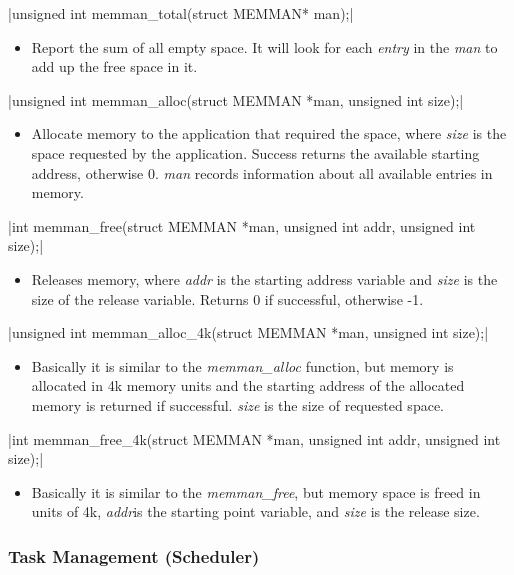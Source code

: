 \documentclass{swfcthesis}
\begin{document}
\csingle|unsigned int memman_total(struct MEMMAN* man);|
\begin{itemize}
\item Report the sum of all empty space. It will look for each \emph{entry} in the
  \emph{man} to add up the free space in it.
  
\end{itemize}

\csingle|unsigned int memman_alloc(struct MEMMAN *man, unsigned int size);|
\begin{itemize}
\item Allocate memory to the application that required the space, where \emph{size} is the space requested by the
  application. Success returns the available starting address, otherwise 0. \emph{man} records
  information about all available entries in memory.
  
\end{itemize}

\csingle|int memman_free(struct MEMMAN *man, unsigned int addr, unsigned int size);|
\begin{itemize}
\item Releases memory, where \emph{addr} is the starting address variable and
  \emph{size} is the size of the release variable. Returns 0 if successful, otherwise
  -1.
\end{itemize}

\csingle|unsigned int memman_alloc_4k(struct MEMMAN *man, unsigned int size);|
\begin{itemize}
\item Basically it is similar to the \emph{memman\_alloc} function, but memory is allocated
  in 4k memory units and the starting address of the allocated memory is returned if
  successful. \emph{size} is the size of requested space.
\end{itemize}

\csingle|int memman_free_4k(struct MEMMAN *man, unsigned int addr, unsigned int size);|
\begin{itemize}
\item Basically it is similar to the \emph{memman\_free}, but memory space is freed in
  units of 4k, \emph{addr}is the starting point variable, and \emph{size} is the
  release size.
\end{itemize}

\subsubsection{Task Management (Scheduler)}
\label{sec:task-management}
\end{document}
